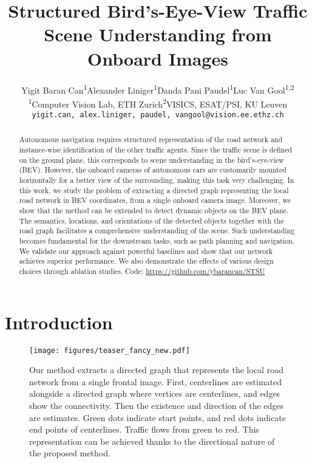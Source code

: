 \documentclass[10pt,twocolumn,letterpaper]{article}
\begin{document}
\title{Structured Bird's-Eye-View Traffic Scene Understanding from Onboard Images }
\author{ Yigit Baran Can\textsuperscript{1}\space\space\space\space Alexander Liniger\textsuperscript{1}\space\space\space\space Danda Pani Paudel\textsuperscript{1}\space\space\space\space Luc Van Gool\textsuperscript{1,2}\\
\textsuperscript{1}Computer Vision Lab, ETH Zurich\space\space\space\space \textsuperscript{2}VISICS, ESAT/PSI, KU Leuven \\ {\tt\small yigit.can, alex.liniger, paudel, vangool@vision.ee.ethz.ch} }
\maketitle
\ificcvfinal\thispagestyle{empty}\fi

\begin{abstract}
Autonomous navigation requires structured representation of the road network and instance-wise identification of the other traffic agents. Since the traffic scene is defined on the ground plane, this corresponds to scene understanding in the bird's-eye-view (BEV). However, the onboard cameras of autonomous cars are customarily mounted horizontally for a better view of the surrounding, making this task very challenging. In this work, we study the problem of extracting a directed graph representing the local road network in BEV coordinates, from a single onboard camera image. Moreover, we show that the method can be extended to detect dynamic objects on the BEV plane. The semantics, locations, and orientations of the detected objects together with the road graph facilitates a comprehensive understanding of the scene. Such understanding becomes fundamental for the downstream tasks, such as path planning and navigation. We validate our approach against powerful baselines and show that our network achieves superior performance. We also demonstrate the effects of various design choices through ablation studies. Code: \url{https://github.com/ybarancan/STSU}
\end{abstract}

\section{Introduction}

\begin{figure}
    \centering
    \texttt{[image: figures/teaser\_fancy\_new.pdf]}
\caption{Our method extracts a directed graph that represents the local road network from a single frontal image. First, centerlines are estimated alongside a directed graph where vertices are centerlines, and edges show the connectivity. Then the existence and direction of the edges are estimates. Green dots indicate start points, and red dots indicate end points of centerlines. Traffic flows from green to red. This representation can be achieved thanks to the directional nature of the proposed method.}
    \label{fig:teaser}
    \vspace{-1em}
\end{figure}
\end{document}
